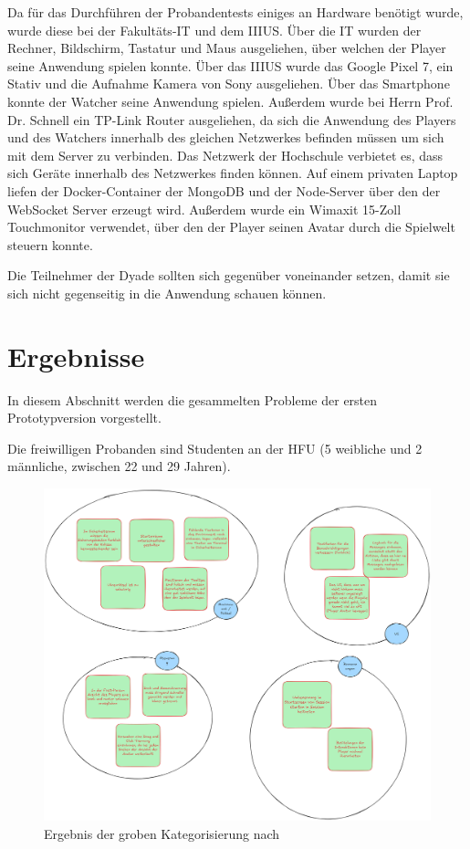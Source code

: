 Da für das Durchführen der Probandentests einiges an Hardware benötigt wurde, wurde diese bei der Fakultäts-\ac{IT} und dem \ac{IIIUS}. Über die \ac{IT} wurden der Rechner, Bildschirm, Tastatur und Maus ausgeliehen, über welchen der Player seine Anwendung spielen konnte. Über das \ac{IIIUS} wurde das Google Pixel 7, ein Stativ und die Aufnahme Kamera von Sony ausgeliehen. Über das Smartphone konnte der Watcher seine Anwendung spielen. Außerdem wurde bei Herrn Prof. Dr. Schnell ein TP-Link Router ausgeliehen, da sich die Anwendung des Players und des Watchers innerhalb des gleichen Netzwerkes befinden müssen um sich mit dem Server zu verbinden. Das Netzwerk der Hochschule verbietet es, dass sich Geräte innerhalb des Netzwerkes finden können.
Auf einem privaten Laptop liefen der Docker-Container der MongoDB und der Node-Server über den der WebSocket Server erzeugt wird. Außerdem wurde ein Wimaxit 15-Zoll Touchmonitor verwendet, über den der Player seinen Avatar durch die Spielwelt steuern konnte.

Die Teilnehmer der Dyade sollten sich gegenüber voneinander setzen, damit sie sich nicht gegenseitig in die Anwendung schauen können.

\section{Ergebnisse}
In diesem Abschnitt werden die gesammelten Probleme der ersten Prototypversion vorgestellt.

Die freiwilligen Probanden sind Studenten an der \ac{HFU} (5 weibliche und 2 männliche, zwischen 22 und 29 Jahren).

\begin{figure}[ht]
\centering
\includegraphics[width=1\linewidth]{content/pictures/Prestudy-Qualitative-Auswertung-Schritt-1.png}
\caption{Ergebnis der groben Kategorisierung nach \cite{braun_using_2006}}
\label{fig:pre-study-qualitative-findings}
\end{figure}

